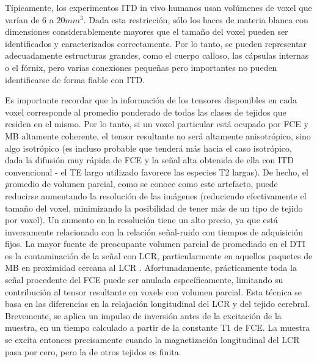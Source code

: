 Típicamente, los experimentos ITD in vivo humanos usan volúmenes de voxel que varían de 6 a $20 mm^{3}$. Dada esta restricción, sólo los haces de materia blanca con dimensiones considerablemente mayores que el tamaño del voxel pueden ser identificados y caracterizados correctamente. Por lo tanto, se pueden representar adecuadamente estructuras grandes, como el cuerpo calloso, las cápsulas internas o el fórnix, pero varias conexiones pequeñas pero importantes no pueden identificarse de forma fiable con ITD.

Es importante recordar que la información de los tensores disponibles en cada voxel corresponde al promedio ponderado de todas las clases de tejidos que residen en el mismo. Por lo tanto, si un voxel particular está ocupado por FCE y MB altamente coherente, el tensor resultante no será altamente anisotrópico, sino algo isotrópico (es incluso probable que tenderá más hacia el caso isotrópico, dada la difusión muy rápida de FCE y la señal alta obtenida de ella con ITD convencional - el TE largo utilizado favorece las especies T2 largas). De hecho, el {\emph promedio de volumen parcial}, como se conoce como este artefacto, puede reducirse aumentando la resolución de las imágenes (reduciendo efectivamente el tamaño del voxel, minimizando la posibilidad de tener más de un tipo de tejido por voxel). Un aumento en la resolución tiene un alto precio, ya que está inversamente relacionado con la relación señal-ruido con tiempos de adquisición fijos. La mayor fuente de preocupante volumen parcial de promediado en el DTI es la contaminación de la señal con LCR, particularmente en aquellos paquetes de MB en proximidad cercana al LCR \cite{Concha_2005}. Afortunadamente, prácticamente toda la señal procedente del FCE puede ser anulada específicamente, limitando su contribución al tensor resultante en voxels con volumen parcial. Esta técnica se basa en las diferencias en la relajación longitudinal del LCR y del tejido cerebral. Brevemente, se aplica un impulso de inversión antes de la excitación de la muestra, en un tiempo calculado a partir de la constante T1 de FCE. La muestra se excita entonces precisamente cuando la magnetización longitudinal del LCR pasa por cero, pero la de otros tejidos es finita.

